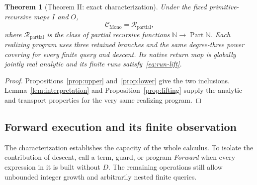 \documentclass[11pt]{article}
\numberwithin{equation}{section}
\newtheorem{theorem}{Theorem}[section]
\theoremstyle{definition}
\theoremstyle{remark}
\newcommand{\N}{\mathbb N}
\newcommand{\Part}{\operatorname{Part}}
\begin{document}
\begin{theorem}[Theorem II: exact characterization]\label{thm:characterization}
Under the fixed primitive-recursive maps $I$ and $O$,
\begin{equation}\label{eq:characterization}
 \mathcal C_{\mathrm{Mono}}=\mathcal R_{\mathrm{partial}},
\end{equation}
where $\mathcal R_{\mathrm{partial}}$ is the class of partial recursive
functions $\N\to\Part\N$. Each realizing program uses three retained
branches and the same degree-three power covering for every finite
query and descent. Its native return map is globally jointly real
analytic and its finite runs satisfy~\eqref{eq:run-lift}.
\end{theorem}
\begin{proof}
Propositions~\ref{prop:upper} and~\ref{prop:lower} give the two
inclusions. Lemma~\ref{lem:interpretation} and
Proposition~\ref{prop:lifting} supply the analytic and transport
properties for the very same realizing program.
\end{proof}

\subsection{Forward execution and its finite observation}

The characterization establishes the capacity of the whole calculus.
To isolate the contribution of descent, call a term, guard, or program
\emph{Forward} when every expression in it is built without $D$.
The remaining operations still allow unbounded integer growth and
arbitrarily nested finite queries.
\end{document}
